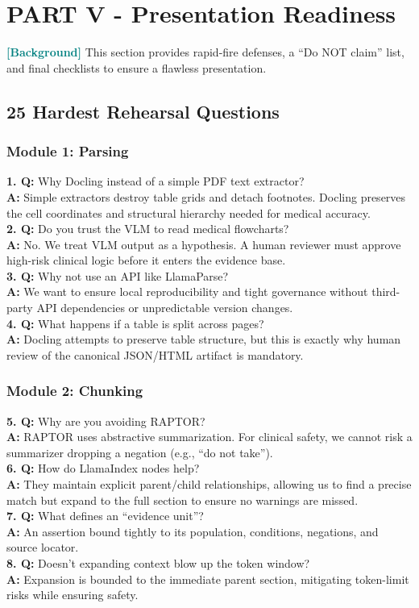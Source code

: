 \documentclass[11pt,a4paper]{article}
\newcommand{\origintag}[2]{\textcolor{#1}{\small\textbf{[#2]}}}
\begin{document}
\newpage
\section{PART V - Presentation Readiness}

\origintag{teal}{Background} This section provides rapid-fire defenses, a ``Do NOT claim'' list, and final checklists to ensure a flawless presentation.

\subsection{25 Hardest Rehearsal Questions}

\subsubsection{Module 1: Parsing}
\textbf{1. Q:} Why Docling instead of a simple PDF text extractor? \\
\textbf{A:} Simple extractors destroy table grids and detach footnotes. Docling preserves the cell coordinates and structural hierarchy needed for medical accuracy. \\
\textbf{2. Q:} Do you trust the VLM to read medical flowcharts? \\
\textbf{A:} No. We treat VLM output as a hypothesis. A human reviewer must approve high-risk clinical logic before it enters the evidence base. \\
\textbf{3. Q:} Why not use an API like LlamaParse? \\
\textbf{A:} We want to ensure local reproducibility and tight governance without third-party API dependencies or unpredictable version changes. \\
\textbf{4. Q:} What happens if a table is split across pages? \\
\textbf{A:} Docling attempts to preserve table structure, but this is exactly why human review of the canonical JSON/HTML artifact is mandatory.

\subsubsection{Module 2: Chunking}
\textbf{5. Q:} Why are you avoiding RAPTOR? \\
\textbf{A:} RAPTOR uses abstractive summarization. For clinical safety, we cannot risk a summarizer dropping a negation (e.g., ``do not take''). \\
\textbf{6. Q:} How do LlamaIndex nodes help? \\
\textbf{A:} They maintain explicit parent/child relationships, allowing us to find a precise match but expand to the full section to ensure no warnings are missed. \\
\textbf{7. Q:} What defines an ``evidence unit''? \\
\textbf{A:} An assertion bound tightly to its population, conditions, negations, and source locator. \\
\textbf{8. Q:} Doesn't expanding context blow up the token window? \\
\textbf{A:} Expansion is bounded to the immediate parent section, mitigating token-limit risks while ensuring safety.
\end{document}
